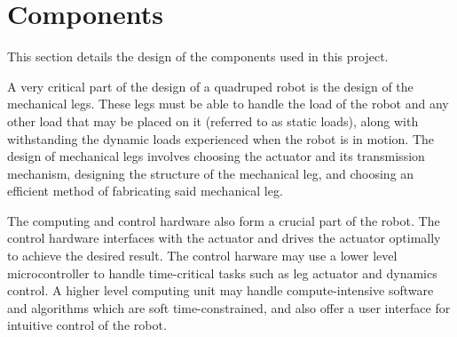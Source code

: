 \section{Components}

This section details the design of the components used in this project.

A very critical part of the design of a quadruped robot is the design of the mechanical legs. These legs must be able to handle the load of the robot and any other load that may be placed on it (referred to as static loads), along with withstanding the dynamic loads experienced when the robot is in motion. The design of mechanical legs involves choosing the actuator and its transmission mechanism, designing the structure of the mechanical leg, and choosing an efficient method of fabricating said mechanical leg.

The computing and control hardware also form a crucial part of the robot. The control hardware interfaces with the actuator and drives the actuator optimally to achieve the desired result. The control harware may use a lower level microcontroller to handle time-critical tasks such as leg actuator and dynamics control. A higher level computing unit may handle compute-intensive software and algorithms which are soft time-constrained, and also offer a user interface for intuitive control of the robot.

